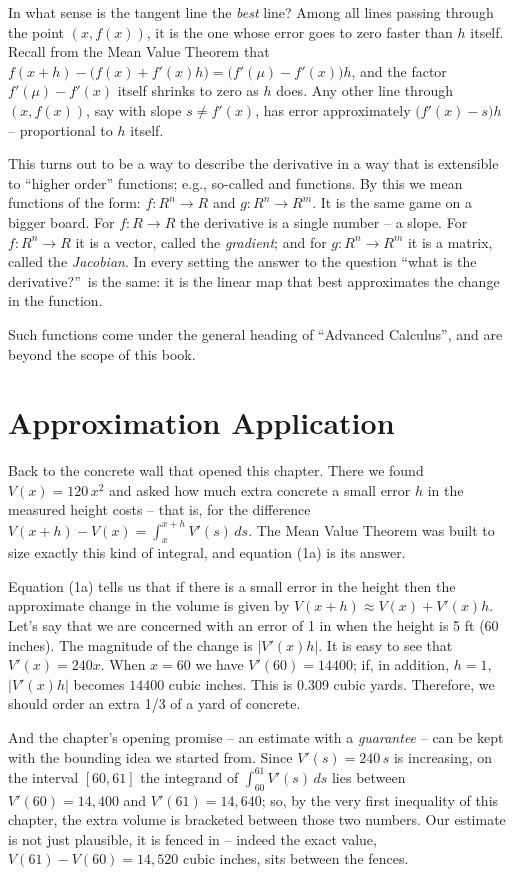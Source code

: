 In what sense is the tangent line the {\it best\/} line? Among all lines passing
through the point $(x, f(x))$, it is the one whose error goes to zero faster than
$h$ itself. Recall from the Mean Value Theorem that
$f(x+h) - \bigl(f(x) + f'(x)h\bigr) = \bigl(f'(\mu) - f'(x)\bigr)h$, and the factor
$f'(\mu) - f'(x)$ itself shrinks to zero as $h$ does. Any other line through
$(x, f(x))$, say with slope $s \ne f'(x)$, has error approximately
$\bigl(f'(x) - s\bigr)h$ -- proportional to $h$ itself.

This turns out to be a way to describe the derivative in a way that is extensible
to ``higher order'' functions; e.g., so-called {\it {}} and
{\it {}} functions.
By this we mean functions of the form:
$f: R^n \rightarrow R$ and $g: R^n \rightarrow R^m$.
It is the same game on a bigger board. For $f: R \rightarrow R$ the derivative is a
single number -- a slope. For $f: R^n \rightarrow R$ it is a vector, called the
{\it gradient\/}; and for $g: R^n \rightarrow R^m$ it is a matrix, called the
{\it Jacobian\/}. In every setting the answer to the question ``what is the
derivative?''\ is the same: it is the linear map that best approximates the
change in the function.

Such functions come under the general heading of ``Advanced Calculus'',
and are beyond the scope of this book.

\section{Approximation Application}
Back to the concrete wall that opened this chapter. There we found
$V(x) = 120\, x^2$ and asked how much extra concrete a small error $h$ in
the measured height costs -- that is, for the difference
$V(x+h) - V(x) = \int_x^{x+h} V'(s)\, ds$. The Mean Value Theorem was built
to size exactly this kind of integral, and equation (1a) is its answer.

Equation (1a) tells us that if there is a small error in the height then  the
approximate change in the volume is given by $V(x+h) \approx V(x) + V'(x) h$. Let's say that we are concerned with an error of
1 in when the height is 5 ft (60 inches). The magnitude of the change is $|V'(x)h|$. It is easy to see that $V'(x) = 240
x$.  When $x = 60$ we have
 $V'(60) = 14400$; if, in addition, $h=1$,  $|V'(x)h|$ becomes $14400$ cubic inches. This is 0.309 cubic yards.
Therefore, we should order an extra 1/3 of a yard of concrete.

And the chapter's opening promise -- an estimate with a {\it guarantee\/} --
can be kept with the bounding idea we started from. Since $V'(s) = 240\, s$
is increasing, on the interval $[60, 61]$ the integrand of
$\int_{60}^{61} V'(s)\, ds$ lies between $V'(60) = 14{,}400$ and
$V'(61) = 14{,}640$; so, by the very first inequality of this chapter, the
extra volume is bracketed between those two numbers. Our estimate is not
just plausible, it is fenced in -- indeed the exact value,
$V(61) - V(60) = 14{,}520$ cubic inches, sits between the fences.

